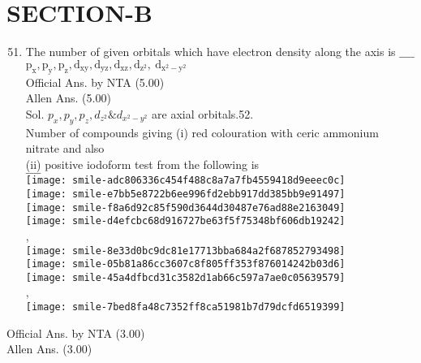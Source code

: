 \documentclass[10pt]{article}
\begin{document}
\section*{SECTION-B}
\begin{enumerate}
  \setcounter{enumi}{50}
  \item The number of given orbitals which have electron density along the axis is \(\_\_\_\_\)\\
\(\mathrm{p}_{\mathrm{x}}, \mathrm{p}_{\mathrm{y}}, \mathrm{p}_{\mathrm{z}}, \mathrm{d}_{\mathrm{xy}}, \mathrm{d}_{\mathrm{yz}}, \mathrm{d}_{\mathrm{xz}}, \mathrm{d}_{\mathrm{z}^{2}}, \mathrm{~d}_{\mathrm{x}^{2}-\mathrm{y}^{2}}\)\\
Official Ans. by NTA (5.00)\\
Allen Ans. (5.00)\\
Sol. \(p_{x}, p_{y}, p_{z}, d_{z^{2}} \& d_{x^{2}-y^{2}}\) are axial orbitals.52.\\
Number of compounds giving (i) red colouration with ceric ammonium nitrate and also\\
(ii) positive iodoform test from the following is\\
\(\_\_\_\_\)\\
\texttt{[image: smile-adc806336c454f488c8a7a7fb4559418d9eeec0c]}\\
\texttt{[image: smile-e7bb5e8722b6ee996fd2ebb917dd385bb9e91497]}\\
\texttt{[image: smile-f8a6d92c85f590d3644d30487e76ad88e2163049]}\\
\texttt{[image: smile-d4efcbc68d916727be63f5f75348bf606db19242]}\\
,\\
\texttt{[image: smile-8e33d0bc9dc81e17713bba684a2f687852793498]}\\
\texttt{[image: smile-05b81a86cc3607c8f805ff353f876014242b03d6]}\\
\texttt{[image: smile-45a4dfbcd31c3582d1ab66c597a7ae0c05639579]}\\
,\\
\texttt{[image: smile-7bed8fa48c7352ff8ca51981b7d79dcfd6519399]}
\end{enumerate}

Official Ans. by NTA (3.00)\\
Allen Ans. (3.00)
\end{document}

